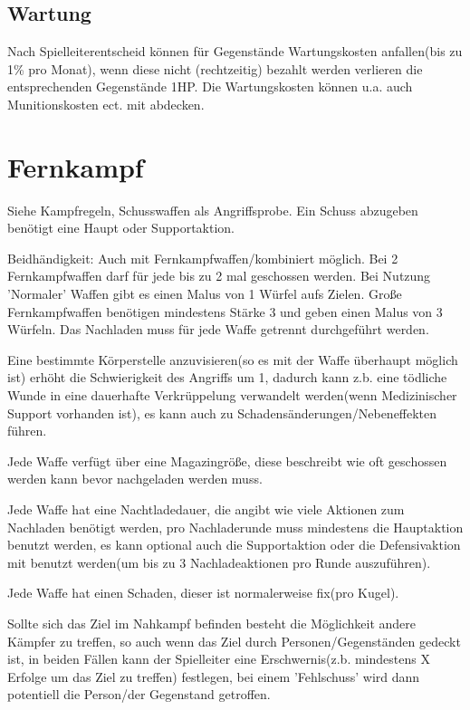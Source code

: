 \subsection{Wartung}
Nach Spielleiterentscheid können für Gegenstände Wartungskosten anfallen(bis zu 1\% pro Monat), wenn diese nicht (rechtzeitig) bezahlt werden verlieren die entsprechenden Gegenstände 1HP. Die Wartungskosten können u.a. auch Munitionskosten ect. mit abdecken.

\section{Fernkampf}

Siehe Kampfregeln, Schusswaffen als Angriffsprobe. Ein Schuss abzugeben benötigt eine Haupt oder Supportaktion.

Beidhändigkeit: Auch mit Fernkampfwaffen/kombiniert möglich. Bei 2 Fernkampfwaffen darf für jede bis zu 2 mal geschossen werden. Bei Nutzung 'Normaler' Waffen gibt es einen Malus von 1 Würfel aufs Zielen. Große Fernkampfwaffen benötigen mindestens Stärke 3 und geben einen Malus von 3 Würfeln. Das Nachladen muss für jede Waffe getrennt durchgeführt werden.

Eine bestimmte Körperstelle anzuvisieren(so es mit der Waffe überhaupt möglich ist) erhöht die Schwierigkeit des Angriffs um 1, dadurch kann z.b. eine tödliche Wunde in eine dauerhafte Verkrüppelung verwandelt werden(wenn Medizinischer Support vorhanden ist), es kann auch zu Schadensänderungen/Nebeneffekten führen.

Jede Waffe verfügt über eine Magazingröße, diese beschreibt wie oft geschossen werden kann bevor nachgeladen werden muss.

Jede Waffe hat eine Nachtladedauer, die angibt wie viele Aktionen zum Nachladen benötigt werden, pro Nachladerunde muss mindestens die Hauptaktion benutzt werden, es kann optional auch die Supportaktion oder die Defensivaktion mit benutzt werden(um bis zu 3 Nachladeaktionen pro Runde auszuführen).

Jede Waffe hat einen Schaden, dieser ist normalerweise fix(pro Kugel).

Sollte sich das Ziel im Nahkampf befinden besteht die Möglichkeit andere Kämpfer zu treffen, so auch wenn das Ziel durch Personen/Gegenständen gedeckt ist, in beiden Fällen kann der Spielleiter eine Erschwernis(z.b. mindestens X Erfolge um das Ziel zu treffen) festlegen, bei einem 'Fehlschuss' wird dann potentiell die Person/der Gegenstand getroffen.

